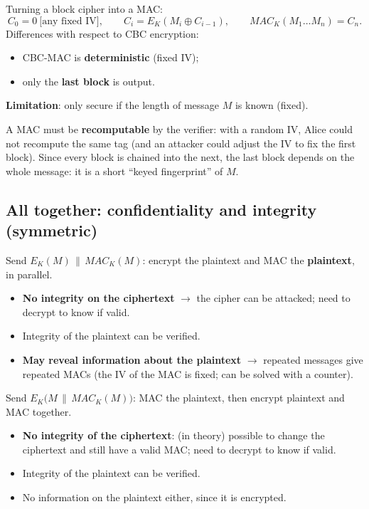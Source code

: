\begin{defnbox}[title=CBC-MAC]
Turning a block cipher into a MAC:
\[
  C_0 = 0 \ \text{[any fixed IV]}, \qquad C_i = E_K(M_i \oplus C_{i-1}), \qquad
  MAC_K(M_1 \ldots M_n) = C_n .
\]
Differences with respect to CBC encryption:
\begin{itemize}
  \item CBC-MAC is \textbf{deterministic} (fixed IV);
  \item only the \textbf{last block} is output.
\end{itemize}
\textbf{Limitation}: only secure if the length of message $M$ is known (fixed).
\end{defnbox}

\begin{rembox}[title=Why a fixed IV and why only the last block?]
A MAC must be \textbf{recomputable} by the verifier: with a random IV, Alice could not
recompute the same tag (and an attacker could adjust the IV to fix the first block).
Since every block is chained into the next, the last block depends on the whole message:
it is a short ``keyed fingerprint'' of $M$.
\end{rembox}

\subsection{All together: confidentiality and integrity (symmetric)}

\begin{defnbox}[title=Encrypt-and-MAC]
Send $E_K(M) \,\|\, MAC_K(M)$: encrypt the plaintext and MAC the \textbf{plaintext},
in parallel.
\begin{itemize}
  \item[$\times$] \textbf{No integrity on the ciphertext} $\to$ the cipher can be
        attacked; need to decrypt to know if valid.
  \item[$\checkmark$] Integrity of the plaintext can be verified.
  \item[$\times$] \textbf{May reveal information about the plaintext} $\to$ repeated
        messages give repeated MACs (the IV of the MAC is fixed; can be solved with a
        counter).
\end{itemize}
\end{defnbox}

\begin{defnbox}[title=MAC-then-Encrypt]
Send $E_K\big(M \,\|\, MAC_K(M)\big)$: MAC the plaintext, then encrypt plaintext and MAC
together.
\begin{itemize}
  \item[$\times$] \textbf{No integrity of the ciphertext}: (in theory) possible to change
        the ciphertext and still have a valid MAC; need to decrypt to know if valid.
  \item[$\checkmark$] Integrity of the plaintext can be verified.
  \item[$\checkmark$] No information on the plaintext either, since it is encrypted.
\end{itemize}
\end{defnbox}

